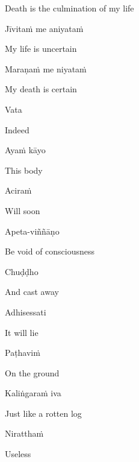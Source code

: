 \begin{english}
Death is the culmination of my life
\end{english}

Jīvitaṁ me aniyataṁ

\begin{english}
My life is uncertain
\end{english}

Maraṇaṁ me niyataṁ

\begin{english}
My death is certain
\end{english}


Vata

\begin{english}
Indeed
\end{english}

Ayaṁ kāyo

\begin{english}
  This body
\end{english}

Aciraṁ

\begin{english}
  Will soon
\end{english}

Apeta-viññāṇo

\begin{english}
Be void of consciousness
\end{english}

Chuḍḍho

\begin{english}
And cast away
\end{english}

Adhisessati

\begin{english}
It will lie
\end{english}

Paṭhaviṁ

\begin{english}
On the ground
\end{english}

Kaliṅgaraṁ iva

\begin{english}
Just like a rotten log
\end{english}

Niratthaṁ

\begin{english}
Useless
\end{english}

